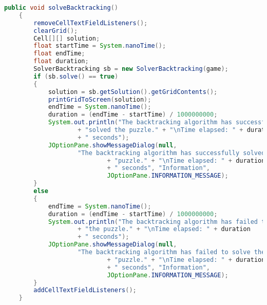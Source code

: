 \begin{lstlisting}[language=Java,basicstyle=\tiny,caption=GUI.java]
    public void solveBacktracking()
    {
        removeCellTextFieldListeners();
        clearGrid();
        Cell[][] solution;
        float startTime = System.nanoTime();
        float endTime;
        float duration;
        SolverBacktracking sb = new SolverBacktracking(game);
        if (sb.solve() == true)
        {
            solution = sb.getSolution().getGridContents();
            printGridToScreen(solution);
            endTime = System.nanoTime();
            duration = (endTime - startTime) / 1000000000;
            System.out.println("The backtracking algorithm has successfully "
                    + "solved the puzzle." + "\nTime elapsed: " + duration 
                    + " seconds");
            JOptionPane.showMessageDialog(null, 
                    "The backtracking algorithm has successfully solved the " 
                            + "puzzle." + "\nTime elapsed: " + duration 
                            + " seconds", "Information", 
                            JOptionPane.INFORMATION_MESSAGE);
        }
        else
        {
            endTime = System.nanoTime();
            duration = (endTime - startTime) / 1000000000;
            System.out.println("The backtracking algorithm has failed to solve "
                    + "the puzzle." + "\nTime elapsed: " + duration 
                    + " seconds");
            JOptionPane.showMessageDialog(null, 
                    "The backtracking algorithm has failed to solve the " 
                            + "puzzle." + "\nTime elapsed: " + duration 
                            + " seconds", "Information", 
                            JOptionPane.INFORMATION_MESSAGE);
        }
        addCellTextFieldListeners();
    }
    

\end{lstlisting}
